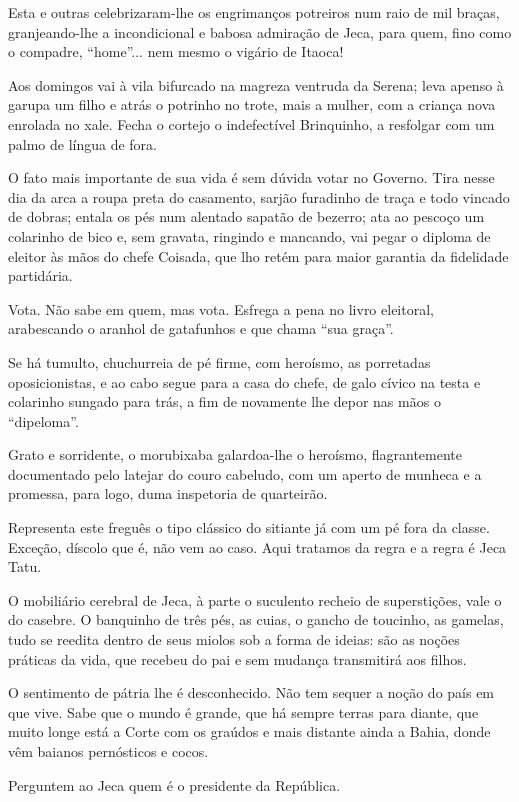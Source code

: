 Esta e outras celebrizaram-lhe os engrimanços potreiros num raio de mil
braças, granjeando-lhe a incondicional e babosa admiração de Jeca, para
quem, fino como o compadre, ``home''... nem mesmo o vigário de Itaoca!

Aos domingos vai à vila bifurcado na magreza ventruda da Serena; leva
apenso à garupa um filho e atrás o potrinho no trote, mais a mulher, com
a criança nova enrolada no xale. Fecha o cortejo o indefectível
Brinquinho, a resfolgar com um palmo de língua de fora.

O fato mais importante de sua vida é sem dúvida votar no Governo. Tira
nesse dia da arca a roupa preta do casamento, sarjão furadinho de traça
e todo vincado de dobras; entala os pés num alentado sapatão de bezerro;
ata ao pescoço um colarinho de bico e, sem gravata, ringindo e mancando,
vai pegar o diploma de eleitor às mãos do chefe Coisada, que lho retém
para maior garantia da fidelidade partidária.

Vota. Não sabe em quem, mas vota. Esfrega a pena no livro eleitoral,
arabescando o aranhol de gatafunhos e que chama ``sua graça''.

Se há tumulto, chuchurreia de pé firme, com heroísmo, as porretadas
oposicionistas, e ao cabo segue para a casa do chefe, de galo cívico na
testa e colarinho sungado para trás, a fim de novamente lhe depor nas
mãos o ``dipeloma''.

Grato e sorridente, o morubixaba galardoa-lhe o heroísmo, flagrantemente
documentado pelo latejar do couro cabeludo, com um aperto de munheca e a
promessa, para logo, duma inspetoria de quarteirão.

Representa este freguês o tipo clássico do sitiante já com um pé fora da
classe. Exceção, díscolo que é, não vem ao caso. Aqui tratamos da regra
e a regra é Jeca Tatu.

O mobiliário cerebral de Jeca, à parte o suculento recheio de
superstições, vale o do casebre. O banquinho de três pés, as cuias, o
gancho de toucinho, as gamelas, tudo se reedita dentro de seus miolos
sob a forma de ideias: são as noções práticas da vida, que recebeu do
pai e sem mudança transmitirá aos filhos.

O sentimento de pátria lhe é desconhecido. Não tem sequer a noção do
país em que vive. Sabe que o mundo é grande, que há sempre terras para
diante, que muito longe está a Corte com os graúdos e mais distante
ainda a Bahia, donde vêm baianos pernósticos e cocos.

Perguntem ao Jeca quem é o presidente da República.

